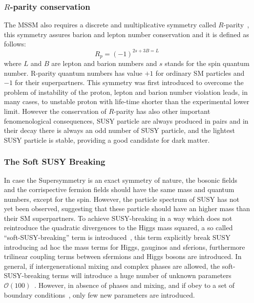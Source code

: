 \subsubsection{$R$-parity conservation}
The MSSM also requires a discrete and multiplicative symmetry called $R$-parity~\cite{djuadi12}, this symmetry assures barion and lepton number 
conservation and it is defined as follows:
\begin{equation}
R_p = (-1)^{2s+3B=L}
\end{equation}
where $L$ and $B$ are lepton and barion numbers and $s$ stands for the spin quantum number. R-parity quantum numbers has value $+1$ for ordinary
SM particles and $-1$ for their superpartners. This symmetry was first introduced to overcome the problem of instability of the proton,
lepton and barion number violation leads, in many cases, 
to unstable proton with life-time shorter than the experimental lower limit. However the conservation of $R$-parity has also other important 
fenomenological consequences, SUSY particle are always produced in pairs and in their decay there is always an odd number of SUSY particle, 
and the lightest SUSY particle is stable, providing a good candidate for dark matter.


\subsubsection{The Soft SUSY Breaking}
In case the Supersymmetry is an exact symmetry of nature, the bosonic fields and the corrispective fermion fields should have the same mass 
and quantum numbers, except for the spin. However, the particle spectrum of SUSY has not yet been observed, suggesting that these particle
 should have an higher mass than their SM superpartners. 
To achieve SUSY-breaking in a way which does not reintroduce the quadratic divergences to the Higgs mass squared, a so called ``soft-SUSY-breaking''
term is introduced~\cite{djuadipage5orBetterPage12}, this term explicitly break SUSY introducing ad hoc the mass terms for Higgs, gauginos and
sferions, furthermore  trilinear coupling terms between sfermions and Higgs bosons are introduced. In general, if intergenerational mixing and 
complex phases are allowed, the soft-SUSY-breaking terms will introduce a huge number of unknown parameters $\mathcal{O}(100)$~\cite{djuadiPage5}.
However, in absence of phases and  mixing, and if obey to a set of boundary conditions~\cite{djuadi5}, only few new parameters are introduced.




